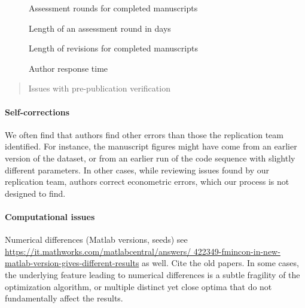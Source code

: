 \documentclass[PP]{AEA}
\begin{document}
\begin{figure}
    \centering
    \caption{Assessment rounds for completed manuscripts}
    \label{fig:pre:rounds}
\end{figure}

\begin{figure}
    \centering
    \caption{Length of an assessment round in days}
    \label{fig:pre:round_length}
\end{figure}

\begin{figure}
    \centering
    \caption{Length of revisions for completed manuscripts}
    \label{fig:pre:revision_length}
\end{figure}




\begin{figure}
    \centering
    \caption{Author response time}
    \label{fig:pre:author_response_time}
\end{figure}

\begin{quote}
    Issues with pre-publication verification
\end{quote}

\paragraph{Self-corrections}

We often find that authors find other errors than those the replication team identified. For instance, the manuscript figures might have come from an earlier version of the dataset, or from an earlier run of the code sequence with slightly different parameters. In other cases, while reviewing issues found by our replication team, authors correct econometric errors, which our process is not designed to find. 

\paragraph{Computational issues}

Numerical differences (Matlab versions, seeds) see \url{https://it.mathworks.com/matlabcentral/answers/
422349-fmincon-in-new-matlab-version-gives-different-results} as well. Cite the old papers. In some cases, the underlying feature leading to numerical differences is a subtle fragility of the optimization algorithm, or multiple distinct yet close optima that do not fundamentally affect the results.
\end{document}

